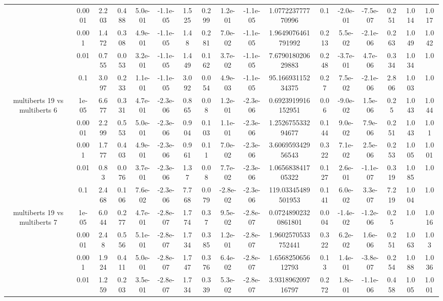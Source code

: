 \begin{tabular}{|c|c|c|c|c|c|c|c|c|c|c|c|c|c|c|c|c|}
 & 0.0001 & 2.203 & 0.488 & 5.0e-01 & -1.1e-05 & 1.525 & 0.299 & 1.2e-01 & -1.1e-05 & 1.077223777770996 & 0.1 & -2.0e-01 & -7.5e-07 & 0.251 & 1.014 & 1.017 \\
 & 0.001 & 1.472 & 0.308 & 4.9e-01 & -1.1e-05 & 1.48 & 0.281 & 7.0e-02 & -1.1e-05 & 1.9649076461791992 & 0.213 & 5.5e-02 & -2.1e-06 & 0.263 & 1.049 & 1.042 \\
 & 0.01 & 0.755 & 0.053 & 3.2e-01 & -1.1e-05 & 1.449 & 0.162 & 3.7e-02 & -1.1e-05 & 7.679018020629883 & 0.248 & -3.7e-01 & 4.7e-06 & 0.334 & 1.034 & 1.0 \\
 & 0.1 & 3.097 & 0.233 & 1.1e-01 & -1.1e-05 & 3.092 & 0.054 & 4.9e-03 & -1.1e-05 & 95.16693115234375 & 0.27 & 7.5e-02 & -2.1e-06 & 2.806 & 1.003 & 1.0 \\
\hline
\multirow{5}{*}{multiberts 19 vs multiberts 6} & 1e-05 & 6.677 & 0.331 & 4.7e-01 & -2.3e-06 & 0.865 & 0.08 & 1.2e-01 & -2.3e-06 & 0.6923919916152951 & 0.06 & -9.0e-02 & 1.5e-06 & 0.25 & 1.043 & 1.044 \\
 & 0.0001 & 2.299 & 0.553 & 5.0e-01 & -2.3e-06 & 0.904 & 0.103 & 1.1e-01 & -2.3e-06 & 1.252675533294677 & 0.144 & 9.0e-02 & 7.9e-06 & 0.251 & 1.043 & 1.01 \\
 & 0.001 & 1.777 & 0.403 & 4.9e-01 & -2.3e-06 & 0.961 & 0.11 & 7.0e-02 & -2.3e-06 & 3.606959342956543 & 0.322 & 7.1e-02 & 2.5e-06 & 0.253 & 1.005 & 1.001 \\
 & 0.01 & 0.83 & 0.076 & 3.7e-01 & -2.3e-06 & 1.37 & 0.08 & 7.7e-02 & -2.3e-06 & 1.065683841705322 & 0.127 & 2.6e-01 & -1.1e-07 & 0.319 & 1.085 & 1.0 \\
 & 0.1 & 2.468 & 0.106 & 7.6e-02 & -2.3e-06 & 7.768 & 0.079 & -2.8e-02 & -2.3e-06 & 119.03345489501953 & 0.141 & 6.0e-02 & 3.3e-07 & 7.219 & 1.004 & 1.0 \\
\hline
\multirow{5}{*}{multiberts 19 vs multiberts 7} & 1e-05 & 6.044 & 0.277 & 4.7e-01 & -2.8e-07 & 1.774 & 0.37 & 9.5e-02 & -2.8e-07 & 0.07248902320861801 & 0.004 & -1.4e-02 & -1.2e-06 & 0.25 & 1.0 & 1.016 \\
 & 0.0001 & 2.48 & 0.556 & 5.1e-01 & -2.8e-07 & 1.734 & 0.385 & 1.2e-01 & -2.8e-07 & 1.9602570533752441 & 0.322 & 6.2e-02 & 1.6e-06 & 0.251 & 1.063 & 1.03 \\
 & 0.001 & 1.924 & 0.411 & 5.0e-01 & -2.8e-07 & 1.747 & 0.376 & 6.4e-02 & -2.8e-07 & 1.656825065612793 & 0.13 & 1.4e-01 & -3.8e-07 & 0.254 & 1.088 & 1.036 \\
 & 0.01 & 1.259 & 0.203 & 3.5e-01 & -2.8e-07 & 1.734 & 0.339 & 5.3e-02 & -2.8e-07 & 3.931896209716797 & 0.272 & 1.8e-01 & -1.1e-06 & 0.458 & 1.005 & 1.001 \\

\end{tabular}
